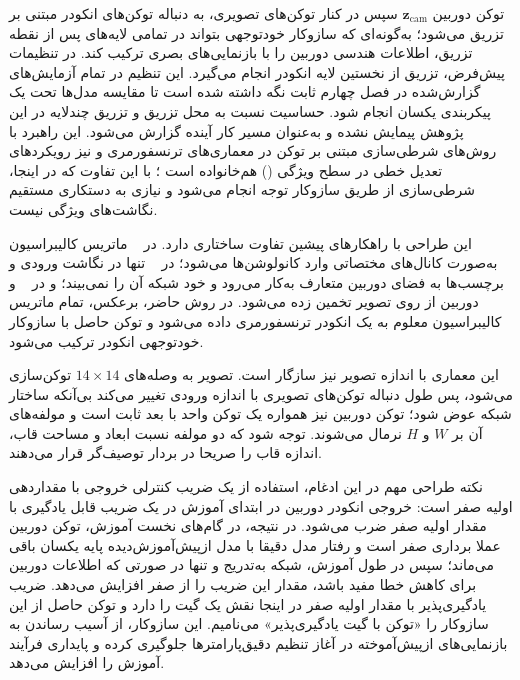توکن دوربین $\mathbf{z}_{\mathrm{cam}}$ سپس در کنار توکن‌های تصویری، به دنباله توکن‌های انکودر مبتنی بر  تزریق می‌شود؛ به‌گونه‌ای که سازوکار خودتوجهی بتواند در تمامی لایه‌های پس از نقطه تزریق، اطلاعات هندسی دوربین را با بازنمایی‌های بصری ترکیب کند. در تنظیمات پیش‌فرض، تزریق از نخستین لایه انکودر انجام می‌گیرد. این تنظیم در تمام آزمایش‌های گزارش‌شده در فصل چهارم ثابت نگه داشته شده است تا مقایسه مدل‌ها تحت یک پیکربندی یکسان انجام شود. حساسیت نسبت به محل تزریق و تزریق چندلایه در این پژوهش پیمایش نشده و به‌عنوان مسیر کار آینده گزارش می‌شود. این راهبرد با روش‌های شرطی‌سازی مبتنی بر توکن در معماری‌های ترنسفورمری و نیز رویکردهای تعدیل خطی در سطح ویژگی () هم‌خانواده است \cite{Perez2018FiLM}؛ با این تفاوت که در اینجا، شرطی‌سازی از طریق سازوکار توجه انجام می‌شود و نیازی به دستکاری مستقیم نگاشت‌های ویژگی نیست.

این طراحی با راهکارهای پیشین تفاوت ساختاری دارد. در ~\cite{Facil2019CAMConvs} ماتریس کالیبراسیون به‌صورت کانال‌های مختصاتی وارد کانولوشن‌ها می‌شود؛ در ~\cite{Yin2023Metric3D} تنها در نگاشت ورودی و برچسب‌ها به فضای دوربین متعارف به‌کار می‌رود و خود شبکه آن را نمی‌بیند؛ و در ~\cite{Piccinelli2024UniDepth} و ~\cite{Bochkovskii2025DepthPro} دوربین از روی تصویر تخمین زده می‌شود. در روش حاضر، برعکس، تمام ماتریس کالیبراسیون معلوم به یک انکودر ترنسفورمری داده می‌شود و توکن حاصل با سازوکار خودتوجهی انکودر ترکیب می‌شود.

این معماری با اندازه تصویر نیز سازگار است. تصویر به وصله‌های $14\times14$ توکن‌سازی می‌شود، پس طول دنباله توکن‌های تصویری با اندازه ورودی تغییر می‌کند بی‌آنکه ساختار شبکه عوض شود؛ توکن دوربین نیز همواره یک توکن واحد با بعد ثابت است و مولفه‌های آن بر $W$ و $H$ نرمال می‌شوند. توجه شود که دو مولفه نسبت ابعاد و مساحت قاب، اندازه قاب را صریحا در بردار توصیف‌گر قرار می‌دهند.

نکته طراحی مهم در این ادغام، استفاده از یک ضریب کنترلی خروجی با مقداردهی اولیه صفر است: خروجی انکودر دوربین در ابتدای آموزش در یک ضریب قابل یادگیری با مقدار اولیه صفر ضرب می‌شود. در نتیجه، در گام‌های نخست آموزش، توکن دوربین عملا برداری صفر است و رفتار مدل دقیقا با مدل ازپیش‌آموزش‌دیده پایه یکسان باقی می‌ماند؛ سپس در طول آموزش، شبکه به‌تدریج و تنها در صورتی که اطلاعات دوربین برای کاهش خطا مفید باشد، مقدار این ضریب را از صفر افزایش می‌دهد. ضریب یادگیری‌پذیر با مقدار اولیه صفر در اینجا نقش یک گیت را دارد و توکن حاصل از این سازوکار را «توکن با گیت یادگیری‌پذیر» می‌نامیم. این سازوکار، از آسیب رساندن به بازنمایی‌های ازپیش‌آموخته در آغاز تنظیم دقیق‌پارامترها جلوگیری کرده و پایداری فرآیند آموزش را افزایش می‌دهد.

